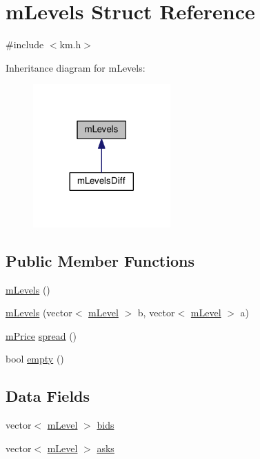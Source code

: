 \hypertarget{struct_k_1_1m_levels}{}\section{m\+Levels Struct Reference}
\label{struct_k_1_1m_levels}


{\ttfamily \#include $<$km.\+h$>$}



Inheritance diagram for m\+Levels\+:
\nopagebreak
\begin{figure}[H]
\begin{center}
\leavevmode
\includegraphics[width=149pt]{struct_k_1_1m_levels__inherit__graph}
\end{center}
\end{figure}
\subsection*{Public Member Functions}
\begin{DoxyCompactItemize}
\item 
\hyperlink{struct_k_1_1m_levels_a99aefce6c3d0d6c9d996bc96f9684e45}{m\+Levels} ()
\item 
\hyperlink{struct_k_1_1m_levels_a10ca86e0fae83aa06fb5943dc4031e1b}{m\+Levels} (vector$<$ \hyperlink{struct_k_1_1m_level}{m\+Level} $>$ b, vector$<$ \hyperlink{struct_k_1_1m_level}{m\+Level} $>$ a)
\item 
\hyperlink{km_8h_a392f9b7f384aa3539bbb890b059f5b8c}{m\+Price} \hyperlink{struct_k_1_1m_levels_a602a1ff7530a970b9f77f20df20d7b8c}{spread} ()
\item 
bool \hyperlink{struct_k_1_1m_levels_a3f37b042a1e7cd4bd38fc564de81f0da}{empty} ()
\end{DoxyCompactItemize}
\subsection*{Data Fields}
\begin{DoxyCompactItemize}
\item 
vector$<$ \hyperlink{struct_k_1_1m_level}{m\+Level} $>$ \hyperlink{struct_k_1_1m_levels_ae01c62df8fdd345c0e9024d06ef863b4}{bids}
\item 
vector$<$ \hyperlink{struct_k_1_1m_level}{m\+Level} $>$ \hyperlink{struct_k_1_1m_levels_a3ba37a921ed6b2dac154fea1798db0d0}{asks}
\end{DoxyCompactItemize}


